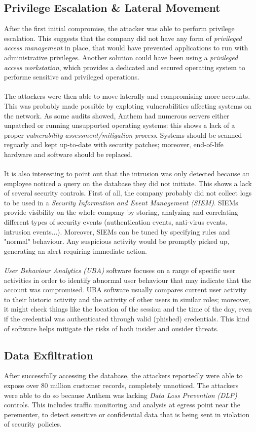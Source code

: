 	\subsection{Privilege Escalation \& Lateral Movement}
	After the first initial compromise, the attacker was able to perform privilege escalation. This suggests that the company did not have any form of \textit{privileged access management} in place, that would have prevented applications to run with administrative privileges. Another solution could have been using a \textit{privileged access workstation}, which provides a dedicated and secured operating system to performe sensitive and privileged operations\cite{paws}.\\\\ %
	The attackers were then able to move laterally and compromising more accounts. This was probably made possible by exploting vulnerabilities affecting systems on the network. As some audits\cite{anthemAuditReport} showed, Anthem had numerous servers either unpatched or running unsupported operating systems: this shows a lack of a proper \textit{vulnerability assessment/mitigation process}. Systems should be scanned reguarly and kept up-to-date with security patches; moreover, end-of-life hardware and software should be replaced.\\\\ %
	It is also interesting to point out that the intrusion was only detected because an employee noticed a query on the database they did not initiate. This shows a lack of several security controls. First of all, the company probably did not collect logs to be used in a \textit{Security Information and Event Management (SIEM)}. SIEMs provide visibility on the whole company by storing, analyzing and correlating different types of security events (authentication events, anti-virus events, intrusion events...). Moreover, SIEMs can be tuned by specifying rules and "normal" behaviour. Any suspicious activity would be promptly picked up, generating an alert requiring immediate action. \\\\
	\textit{User Behaviour Analytics (UBA)} software focuses on a range of specific user activities \cite{uba} in order to identify abnormal user behaviour that may indicate that the account was compromised. UBA software usually compares current user activity to their historic activity and the activity of other users in similar roles; moreover, it might check things like the location of the session and the time of the day, even if the credential was authenticated through valid (phished) credentials. This kind of software helps mitigate the risks of both insider and ousider threats.
	\subsection{Data Exfiltration}
	After successfully accessing the database, the attackers reportedly were able to expose over 80 million customer records, completely unnoticed. The attackers were able to do so because Anthem was lacking \textit{Data Loss Prevention (DLP)} controls. This includes traffic monitoring and analysis at egress point near the perementer, to detect sensitive or confidential data that is being sent in violation of security policies.
